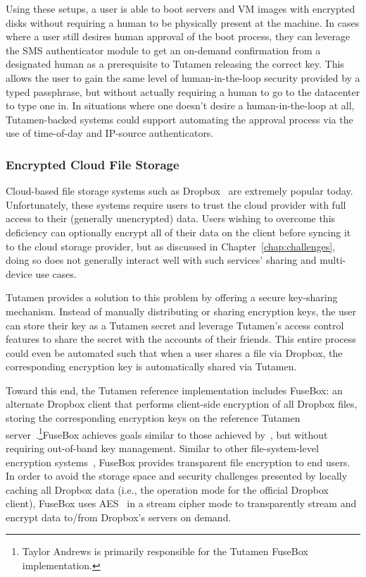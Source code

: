 Using these setups, a user is able to boot servers and VM images with
encrypted disks without requiring a human to be physically present at
the machine. In cases where a user still desires human approval of the
boot process, they can leverage the SMS authenticator module to get an
on-demand confirmation from a designated human as a prerequisite to
Tutamen releasing the correct key. This allows the user to gain the
same level of human-in-the-loop security provided by a typed
passphrase, but without actually requiring a human to go to the
datacenter to type one in. In situations where one doesn't desire a
human-in-the-loop at all, Tutamen-backed systems could support
automating the approval process via the use of time-of-day and
IP-source authenticators.

\subsubsection{Encrypted Cloud File Storage}

Cloud-based file storage systems such as Dropbox~\cite{dropbox} are
extremely popular today. Unfortunately, these systems require users to
trust the cloud provider with full access to their (generally
unencrypted) data. Users wishing to overcome this deficiency can
optionally encrypt all of their data on the client before syncing it
to the cloud storage provider, but as discussed in
Chapter~\ref{chap:challenges}, doing so does not generally interact
well with such services' sharing and multi-device use cases.

Tutamen provides a solution to this problem by offering a secure
key-sharing mechanism. Instead of manually distributing or sharing
encryption keys, the user can store their key as a Tutamen secret and
leverage Tutamen's access control features to share the secret with
the accounts of their friends. This entire process could even be
automated such that when a user shares a file via Dropbox, the
corresponding encryption key is automatically shared via Tutamen.

Toward this end, the Tutamen reference implementation includes
FuseBox: an alternate Dropbox client that performs client-side
encryption of all Dropbox files, storing the corresponding encryption
keys on the reference Tutamen server~\cite{fusebox}.\footnote{Taylor
  Andrews is primarily responsible for the Tutamen FuseBox
  implementation.}FuseBox achieves goals similar to those achieved
by~\cite{goh2003}, but without requiring out-of-band key
management. Similar to other file-system-level encryption
systems~\cite{blaze1993, Cattaneo2001, halcrow}, FuseBox provides
transparent file encryption to end users. In order to avoid the
storage space and security challenges presented by locally caching all
Dropbox data (i.e., the operation mode for the official Dropbox
client), FuseBox uses AES~\cite{daemen1999, nist2001} in a stream
cipher mode to transparently stream and encrypt data to/from Dropbox's
servers on demand.

